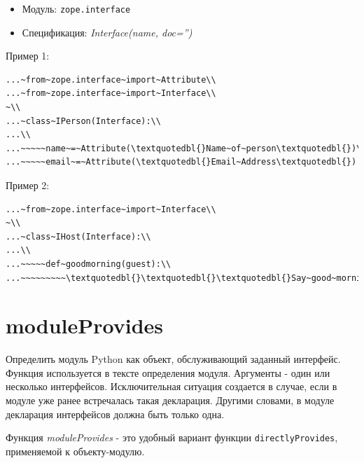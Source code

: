\documentclass[a4paper,openany,twoside,draft]{book}
\providecommand*{\DUroletitlereference}[1]{\textsl{#1}}
\begin{document}
\begin{itemize}

\item Модуль: \texttt{zope.interface}

\item Спецификация: \DUroletitlereference{Interface(name, doc='')}

\end{itemize}

Пример 1:

\begin{verbatim}
...~from~zope.interface~import~Attribute\\
...~from~zope.interface~import~Interface\\
~\\
...~class~IPerson(Interface):\\
...\\
...~~~~~name~=~Attribute(\textquotedbl{}Name~of~person\textquotedbl{})\\
...~~~~~email~=~Attribute(\textquotedbl{}Email~Address\textquotedbl{})
\end{verbatim}

Пример 2:

\begin{verbatim}
...~from~zope.interface~import~Interface\\
~\\
...~class~IHost(Interface):\\
...\\
...~~~~~def~goodmorning(guest):\\
...~~~~~~~~~\textquotedbl{}\textquotedbl{}\textquotedbl{}Say~good~morning~to~guest\textquotedbl{}\textquotedbl{}\textquotedbl{}
\end{verbatim}


\section*{moduleProvides%
  \label{moduleprovides}%
}

Определить модуль Python как объект, обслуживающий заданный интерфейс.
Функция используется в тексте определения модуля.  Аргументы - один
или несколько интерфейсов.  Исключительная ситуация создается в
случае, если в модуле уже ранее встречалась такая декларация.  Другими
словами, в модуле декларация интерфейсов должна быть только одна.

Функция \DUroletitlereference{moduleProvides} - это удобный вариант функции
\texttt{directlyProvides}, применяемой к объекту-модулю.
\end{document}
